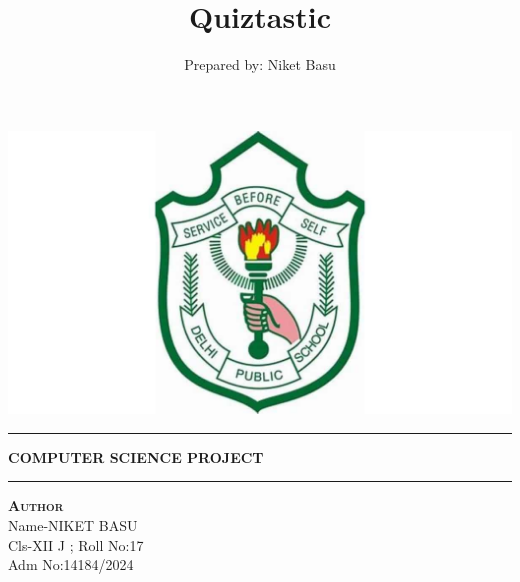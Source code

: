 \documentclass[12pt,a4paper]{article}
\begin{document}
\begin{titlepage}
\begin{center}
\vspace{2cm}
\includegraphics[width=1\textwidth]{dpsSociety.jpg}\\[1cm]
\vspace{2cm}
\hrule
\vspace{.5cm}
{ \huge \bfseries COMPUTER SCIENCE PROJECT} %
\vspace{.5cm}
\hrule
\vspace{1.5cm}
\textsc{\textbf{Author}}\\
\vspace{.5cm}
\centering
Name-NIKET BASU\\
Cls-XII J ; Roll No:17\\
Adm No:14184/2024\\
\vspace{4cm}

\end{center}
\end{titlepage}

\author{Prepared by: Niket Basu}
\date{}
\title{{\bfseries Quiztastic}}

\pagestyle{fancy}
\fancyhf{} %
\rhead{\nouppercase{\rightmark}}
\cfoot{\thepage}
\setlength\headheight{16pt}
\setlength{\footskip}{50pt}
\end{document}
